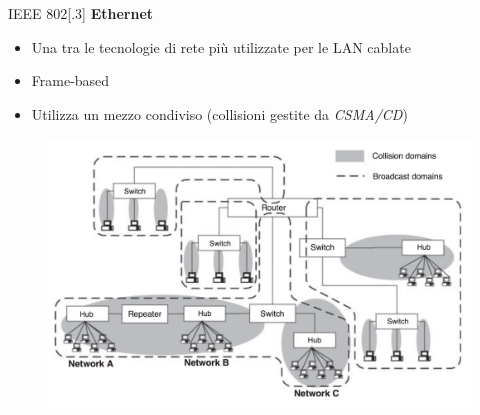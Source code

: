 \begin{frame}{IEEE 802[.3]}
	\textbf{Ethernet}
	\begin{itemize}
		\item Una tra le tecnologie di rete più utilizzate per le LAN cablate
		\item Frame-based
		\item Utilizza un mezzo condiviso (collisioni gestite da \textit{CSMA/CD})
	\end{itemize}
	\begin{figure}[h] 
		\includegraphics[scale=0.23,cfbox=blue_slides 1pt 0pt]{imgs/lan.png}
	\end{figure}
\end{frame}


